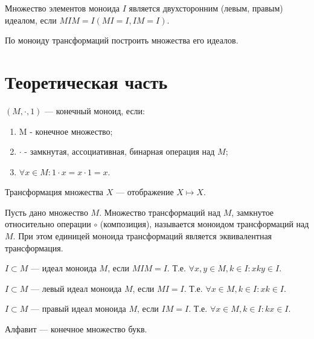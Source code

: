 \documentclass[14pt, russian]{scrartcl}
\begin{document}
Множество элементов моноида $I$ является двухсторонним (левым, правым) идеалом,
если $MIM = I (MI = I, IM = I)$.

По моноиду трансформаций построить множества его идеалов.

\newpage
\section{Теоретическая часть}

\begin{Definition}
  $(M, \cdot, 1)$ --- конечный моноид, если:
  \begin{enumerate}
    \item M - конечное множество;
    \item $\cdot$ - замкнутая, ассоциативная, бинарная операция над $M$;
    \item $\forall x \in M: 1 \cdot x = x \cdot 1 = x$.
  \end{enumerate}
\end{Definition}

\begin{Definition}[Трансформация]
  Трансформация множества $X$ --- отображение $X \mapsto X$.
\end{Definition}

\begin{Definition}
  Пусть дано множество $M$. Множество трансформаций над $M$, замкнутое
  относительно операции $\circ$ (композиция), называется моноидом трансформаций
  над $M$. При этом единицей моноида трансформаций является эквивалентная
  трансформация.
\end{Definition}

\begin{Definition}[Идеал]
  $I \subset M$ --- идеал моноида $M$, если $MIM = I$. Т.е.
  $\forall x, y \in M, k \in I: xky \in I$.
\end{Definition}

\begin{Definition}
  $I \subset M$ --- левый идеал моноида $M$, если $MI = I$. Т.е.
  $\forall x \in M, k \in I: xk \in I$.
\end{Definition}

\begin{Definition}
  $I \subset M$ --- правый идеал моноида $M$, если $IM = I$. Т.е.
  $\forall x \in M, k \in I: kx \in I$.
\end{Definition}

\begin{Definition}[Алфавит]
  Алфавит --- конечное множество букв.
\end{Definition}
\end{document}
